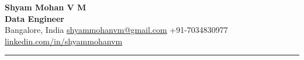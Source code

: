 
\begin{center}
    {\LARGE \textbf{Shyam Mohan V M}} \\[4pt]
    {\normalsize \textbf{Data Engineer}} \\[6pt]
    Bangalore, India \textbar{} 
\href{mailto:shyammohanvm@gmail.com}{shyammohanvm@gmail.com} \textbar{} 
+91-7034830977 \textbar{} 
\href{https://www.linkedin.com/in/shyammohanvm/}{linkedin.com/in/shyammohanvm}
\end{center}
\hrule
\vspace{0.5cm}